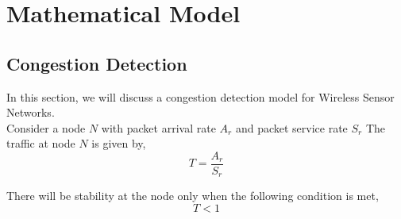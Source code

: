 \documentclass[journal]{IEEEtran}
\begin{document}
%



\section{Mathematical Model}

\subsection{Congestion Detection}
In this section, we will discuss a congestion detection model for Wireless Sensor Networks.\\
Consider a node $N$ with packet arrival rate $A_r$ and packet service rate $S_r$
The traffic at node $N$ is given by,
\begin{equation}
T=\frac{A_r}{S_r}
\end{equation}

There will be stability at the node only when the following condition is met,
\begin{equation}
T<1
\end{equation}
\end{document}
